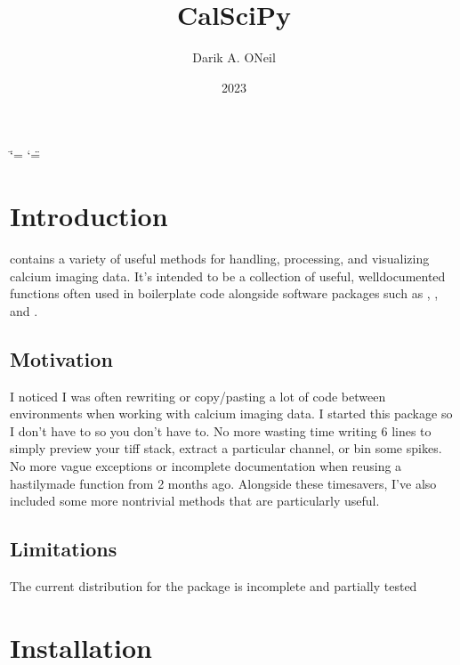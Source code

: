 \documentclass[letterpaper,10pt,english]{sphinxmanual}
\title{CalSciPy}
\date{2023}
\author{Darik A.\@{} O\textquotesingle{}Neil}
\begin{document}
\ifdefined\shorthandoff
  \ifnum\catcode`\=\string=\active\shorthandoff{=}\fi
  \ifnum\catcode`\"=\active{}\fi
\fi

\pagestyle{empty}
\sphinxmaketitle
\pagestyle{plain}
\sphinxtableofcontents
\pagestyle{normal}
\label{\detokenize{index::doc}}


\sphinxstepscope


\chapter{Introduction}
\label{\detokenize{Introduction:introduction}}\label{\detokenize{Introduction::doc}}
\sphinxAtStartPar
{} contains a variety of useful methods for handling, processing, and visualizing calcium imaging data.
It’s intended to be a collection of useful, well\sphinxhyphen{}documented functions often used in boilerplate code alongside software
packages such as , ,
and .


\section{Motivation}
\label{\detokenize{Introduction:motivation}}
\sphinxAtStartPar
I noticed I was often re\sphinxhyphen{}writing or copy/pasting a lot of code between environments when working with calcium imaging
data. I started this package  so I don’t have to  so you don’t have to. No more wasting time writing 6 lines to simply
preview your tiff stack, extract a particular channel, or bin some spikes. No more vague exceptions or incomplete
documentation when re\sphinxhyphen{}using a hastily\sphinxhyphen{}made function from 2 months ago. Alongside these time\sphinxhyphen{}savers, I’ve also included
some more non\sphinxhyphen{}trivial methods that are particularly useful.


\section{Limitations}
\label{\detokenize{Introduction:limitations}}
\sphinxAtStartPar
The current distribution for the package is incomplete and partially tested

\sphinxstepscope


\chapter{Installation}
\label{\detokenize{Installation:installation}}\label{\detokenize{Installation::doc}}
\end{document}
